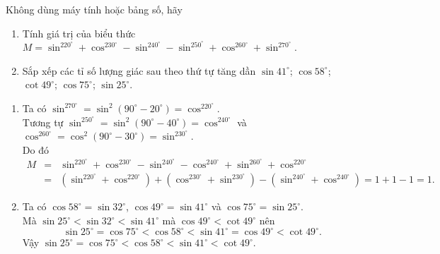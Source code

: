 \begin{bt} Không dùng máy tính hoặc bảng số, hãy 
	\begin{enumerate}
	\item Tính giá trị của biểu thức $M = \sin^220^{\circ} + \cos^230^{\circ} - \sin^240^{\circ} - \sin^250^{\circ} + \cos^260^{\circ} + \sin^270^{\circ}$.
	\item Sắp xếp các tỉ số lượng giác sau theo thứ tự tăng dần $\sin 41^{\circ}$; $\cos 58^{\circ}$; $\cot 49^{\circ}$; $\cos 75^{\circ}$; $\sin 25^{\circ}$.
	\end{enumerate}
	\loigiai
	{	\begin{enumerate}
	\item Ta có $\sin^270^{\circ} = \sin^2\left(90^{\circ}- 20^{\circ}\right) = \cos^220^{\circ}$.\\
	Tương tự $\sin^250^{\circ} = \sin^2\left(90^{\circ}- 40^{\circ}\right) = \cos^240^{\circ}$ và $\cos^260^{\circ} = \cos^2\left(90^{\circ}- 30^{\circ}\right) = \sin^230^{\circ}$.\\
	Do đó 
	\allowdisplaybreaks
	\begin{eqnarray*}
	M &=& \sin^220^{\circ} + \cos^230^{\circ} - \sin^240^{\circ} - \cos^240^{\circ} + \sin^260^{\circ} + \cos^220^{\circ}\\
	&=& \left(\sin^220^{\circ} + \cos^220^{\circ}\right) + \left(\cos^230^{\circ} + \sin^230^{\circ}\right) - \left(\sin^240^{\circ} + \cos^240^{\circ}\right) = 1 + 1 - 1 = 1.
	\end{eqnarray*}
	\item Ta có $\cos 58^{\circ} = \sin 32^{\circ}$, $\cos 49^{\circ} = \sin 41^{\circ}$ và $\cos 75^{\circ} = \sin 25^{\circ}$.\\
	Mà $\sin 25^{\circ} < \sin 32^{\circ}< \sin 41^{\circ}$ mà $\cos 49^{\circ} < \cot 49^{\circ}$ nên 
	$$\sin 25^{\circ} = \cos 75^{\circ} < \cos 58^{\circ}< \sin 41^{\circ} = \cos 49^{\circ} < \cot 49^{\circ}.$$
	Vậy $\sin 25^{\circ} = \cos 75^{\circ} < \cos 58^{\circ} < \sin 41^{\circ} < \cot 49^{\circ}.$
	\end{enumerate}
	}
\end{bt}